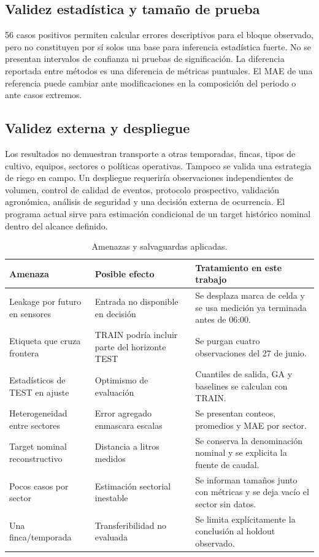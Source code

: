 \documentclass[11pt,letterpaper]{article}
\begin{document}
\subsection{Validez estadística y tamaño de prueba}
56 casos positivos permiten calcular errores descriptivos para el bloque observado, pero no constituyen por sí solos una base para inferencia estadística fuerte. No se presentan intervalos de confianza ni pruebas de significación. La diferencia reportada entre métodos es una diferencia de métricas puntuales. El MAE de una referencia puede cambiar ante modificaciones en la composición del periodo o ante casos extremos.

\subsection{Validez externa y despliegue}
Los resultados no demuestran transporte a otras temporadas, fincas, tipos de cultivo, equipos, sectores o políticas operativas. Tampoco se valida una estrategia de riego en campo. Un despliegue requeriría observaciones independientes de volumen, control de calidad de eventos, protocolo prospectivo, validación agronómica, análisis de seguridad y una decisión externa de ocurrencia. El programa actual sirve para estimación condicional de un target histórico nominal dentro del alcance definido.

\begin{table}[H]
\centering\small
\caption{Amenazas y salvaguardas aplicadas.}\label{tab:amenazas}
\begin{tabularx}{\textwidth}{p{3.5cm}p{5cm}X}
\toprule
Amenaza & Posible efecto & Tratamiento en este trabajo\\
\midrule
Leakage por futuro en sensores & Entrada no disponible en decisión & Se desplaza marca de celda y se usa medición ya terminada antes de 06:00.\\
Etiqueta que cruza frontera & TRAIN podría incluir parte del horizonte TEST & Se purgan cuatro observaciones del 27 de junio.\\
Estadísticos de TEST en ajuste & Optimismo de evaluación & Cuantiles de salida, GA y baselines se calculan con TRAIN.\\
Heterogeneidad entre sectores & Error agregado enmascara escalas & Se presentan conteos, promedios y MAE por sector.\\
Target nominal reconstructivo & Distancia a litros medidos & Se conserva la denominación nominal y se explicita la fuente de caudal.\\
Pocos casos por sector & Estimación sectorial inestable & Se informan tamaños junto con métricas y se deja vacío el sector sin datos.\\
Una finca/temporada & Transferibilidad no evaluada & Se limita explícitamente la conclusión al holdout observado.\\
\bottomrule
\end{tabularx}
\end{table}
\end{document}
